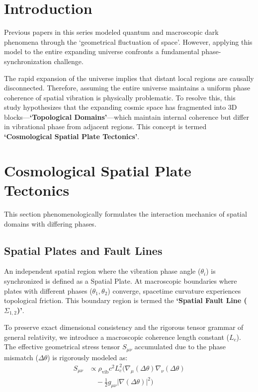 \documentclass[reprint,amsmath,amssymb,aps,prd]{revtex4-2}
\begin{document}
\section{Introduction}
Previous papers in this series modeled quantum and macroscopic dark phenomena through the `geometrical fluctuation of space'. However, applying this model to the entire expanding universe confronts a fundamental phase-synchronization challenge.

The rapid expansion of the universe \cite{Guth1981} implies that distant local regions are causally disconnected. Therefore, assuming the entire universe maintains a uniform phase coherence of spatial vibration is physically problematic. To resolve this, this study hypothesizes that the expanding cosmic space has fragmented into 3D blocks---\textbf{`Topological Domains'}---which maintain internal coherence but differ in vibrational phase from adjacent regions. This concept is termed \textbf{`Cosmological Spatial Plate Tectonics'}.

\section{Cosmological Spatial Plate Tectonics}
This section phenomenologically formulates the interaction mechanics of spatial domains with differing phases.

\subsection{Spatial Plates and Fault Lines}
An independent spatial region where the vibration phase angle ($\theta_i$) is synchronized is defined as a Spatial Plate. At macroscopic boundaries where plates with different phases ($\theta_1, \theta_2$) converge, spacetime curvature experiences topological friction. This boundary region is termed the \textbf{`Spatial Fault Line ($\Sigma_{1,2}$)'}.

To preserve exact dimensional consistency and the rigorous tensor grammar of general relativity, we introduce a macroscopic coherence length constant ($L_c$). The effective geometrical stress tensor $S_{\mu\nu}$ accumulated due to the phase mismatch ($\Delta\theta$) is rigorously modeled as:
\begin{equation}
\begin{split}
S_{\mu\nu} &\propto \rho_{\mathrm{vib}} c^2 L_c^2 \bigg( \nabla_\mu(\Delta\theta) \nabla_\nu(\Delta\theta) \\
&\quad - \frac{1}{2} g_{\mu\nu} |\nabla(\Delta\theta)|^2 \bigg)
\end{split}
\end{equation}
\end{document}
